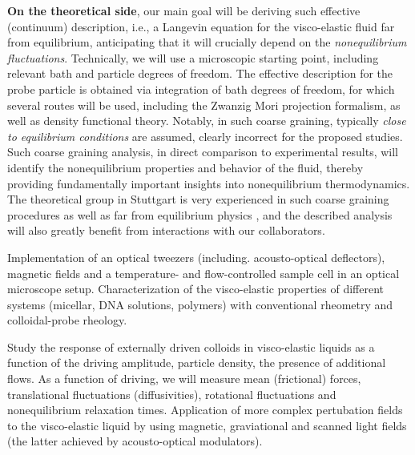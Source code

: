 \begin{workpackage}
\begin{wpdescription}
{\bf On the theoretical side}, our main goal will be deriving such effective (continuum)
description, i.e., a Langevin equation for the visco-elastic fluid far from equilibrium,
anticipating that it will crucially depend on the {\it nonequilibrium
  fluctuations}. Technically, we will use a microscopic starting point, including relevant
bath and particle degrees of freedom. The effective description for the probe particle is
obtained via integration of bath degrees of freedom, for which several routes will be used,
including the Zwanzig Mori projection formalism, as well as density functional
theory. Notably, in such coarse graining, typically {\it close to equilibrium conditions}
are assumed, clearly incorrect for the proposed studies. Such coarse graining analysis, in
direct comparison to experimental results, will identify the nonequilibrium properties and
behavior of the fluid, thereby providing fundamentally important insights into
nonequilibrium thermodynamics. The theoretical group in Stuttgart is very experienced in
such coarse graining procedures \cite{Aerov14} as well as far from equilibrium physics \cite{Kruger11,Kruger09}, and the described analysis will also
greatly benefit from interactions with our collaborators.

\printbibliography[heading=proposal-bib,env=proposal-env]

\end{wpdescription}

\begin{tasklist}

\begin{task}[title=Experimental setup,id=brown-t1,PM=24,lead=USTUTT,wphases=0-24!0.5]
Implementation of an optical tweezers (including. acousto-optical deflectors), magnetic fields and a temperature- and flow-controlled sample cell in an optical microscope setup. Characterization of the visco-elastic properties of different systems (micellar, DNA solutions, polymers) with conventional rheometry and colloidal-probe rheology. 
\end{task}


\begin{task}[title=Externally driven particles in viscoelastic baths,id=brown-t2,PM=24,lead=USTUTT,wphases=0-24!0.5]
Study the response of externally driven colloids in visco-elastic liquids as a function of the driving amplitude, particle density, the presence of additional flows. As a function of driving, we will
measure mean (frictional) forces, translational fluctuations (diffusivities), rotational
fluctuations and nonequilibrium relaxation times. Application of more complex pertubation fields to the visco-elastic liquid by using magnetic, graviational and scanned light fields (the latter achieved by acousto-optical modulators).
\end{task}


\end{tasklist}
\end{workpackage}

